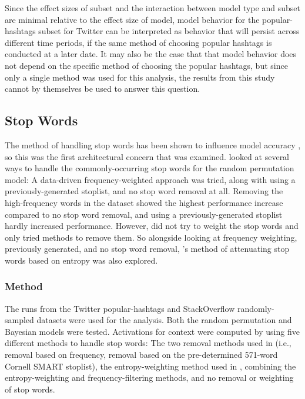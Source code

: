 \documentclass[man,floatsintext,donotrepeattitle]{apa6}
\begin{document}
Since the effect sizes of subset and the interaction between model type and subset are minimal relative to the effect size of model,
model behavior for the popular-hashtags subset for Twitter can be interpreted as behavior that will persist across different time periods,
if the same method of choosing popular hashtags is conducted at a later date.
It may also be the case that that model behavior does not depend on the specific method of choosing the popular hashtags, but since only a single method was used for this analysis,
the results from this study cannot by themselves be used to answer this question.

\subsection{Stop Words}

The method of handling stop words has been shown to influence model accuracy \parencite{Sahlgren2008,Stanley2013}, so this was the first architectural concern that was examined.
\textcite{Sahlgren2008} looked at several ways to handle the commonly-occurring stop words for the random permutation model:
A data-driven frequency-weighted approach was tried, along with using a previously-generated stoplist, and no stop word removal at all.
Removing the high-frequency words in the dataset showed the highest performance increase compared to no stop word removal, and using a previously-generated stoplist hardly increased performance.
However, \citeauthor{Sahlgren2008} did not try to weight the stop words and only tried methods to remove them.
So alongside looking at frequency weighting, previously generated, and no stop word removal, \textcite{Stanley2013}'s method of attenuating stop words based on entropy was also explored.

\subsubsection{Method}

The runs from the Twitter popular-hashtags and StackOverflow randomly-sampled datasets were used for the analysis.
Both the random permutation and Bayesian models were tested.
Activations for context were computed by using five different methods to handle stop words:
The two removal methods used in \textcite{Sahlgren2008} (i.e., removal based on frequency, removal based on the pre-determined 571-word Cornell SMART stoplist),
the entropy-weighting method used in \textcite{Stanley2013},
combining the entropy-weighting and frequency-filtering methods,
and no removal or weighting of stop words.
\end{document}
